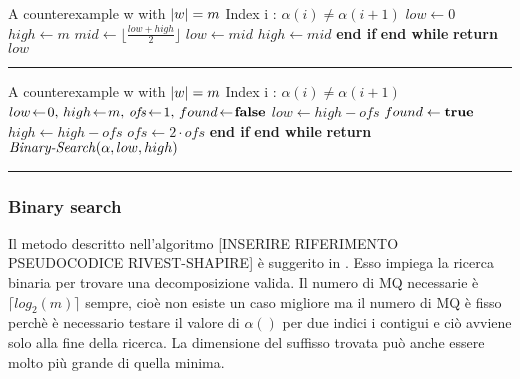 \begin{minipage}{0.48\textwidth}
\captionsetup{format=ruled,labelfont=bf}
 \label{alg:bin}
   
    \begin{algorithmic}[0]
    \small
\Statex
\Input A counterexample w with $\lvert w\rvert=m$
\Output Index i : $\alpha(i) \neq \alpha(i+1)$
\State $low \gets 0$
\State $high \gets m$
\State $mid\gets \lfloor \frac {low+high}{2} \rfloor$
\State $low \gets mid$
\Else
\State $high \gets mid$
\EndIf
\EndWhile
\State \textbf{\quad\:\:end if}
\State \textbf{end while}
\State \textbf{return} $low$


\end{algorithmic}

  \kern2pt\hrule height.8pt\relax
\end{minipage}%
\hfill
\begin{minipage}{0.50\textwidth}
\captionsetup{format=ruled,labelfont=bf}
  \label{alg:exp}
  
    
    \begin{algorithmic}[0]
    \small
\Statex
\Input A counterexample w with $\lvert w\rvert=m$
\Output Index i : $\alpha(i) \neq \alpha(i+1)$
\State $low\! \gets \!0,\, high\! \gets \!m,\, \text{\textit{ofs}}\! \gets \!1,\, found\! \gets \!\text{\textbf{false}}$
\State $low \gets high - ofs$
\State $found \gets \text{\textbf{true}}$
\Else
\State $high \gets high-ofs$
\State $ofs \gets 2 \cdot ofs$
\EndIf
\EndWhile
\State \textbf{\quad\:\:end if}
\State \textbf{end while}
\State \textbf{return} $\text{\textit{Binary-Search}}(\alpha,low,high)$

\end{algorithmic}
  
  \kern2pt\hrule height.8pt\relax
\end{minipage}





   
\subsubsection{Binary search}
Il metodo descritto nell'algoritmo [INSERIRE RIFERIMENTO PSEUDOCODICE RIVEST-SHAPIRE] è suggerito in \cite{Schapire93}. Esso impiega la ricerca binaria per trovare una decomposizione valida. Il numero di \ac{MQ} necessarie è $\lceil log_{2}(m) \rceil$ sempre, cioè non esiste un caso migliore ma il numero di \ac{MQ} è fisso perchè è necessario testare il valore di $\alpha()$ per due indici i contigui e ciò avviene solo alla fine della ricerca. La dimensione del suffisso trovata può anche essere molto più grande di quella minima.
